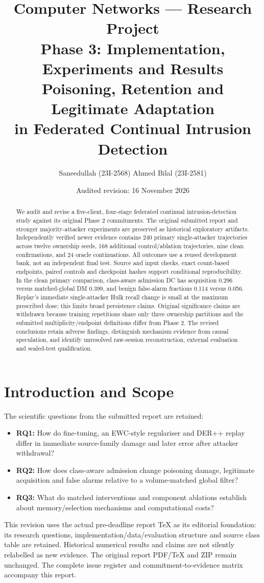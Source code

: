 \documentclass[10pt,a4paper]{article}
\title{\textbf{Computer Networks --- Research Project}\\[4pt]
\large Phase 3: Implementation, Experiments and Results\\[8pt]
\Large Poisoning, Retention and Legitimate Adaptation\\in Federated Continual Intrusion Detection}
\author{Saneedullah (23I-2568) \qquad Ahmed Bilal (23I-2581)}
\date{Audited revision: 16 November 2026}
\begin{document}
\maketitle
\begin{abstract}
We audit and revise a five-client, four-stage federated continual intrusion-detection study against its original Phase 2 commitments. The original submitted report and stronger majority-attacker experiments are preserved as historical exploratory artifacts. Independently verified newer evidence contains 240 primary single-attacker trajectories across twelve ownership seeds, 168 additional control/ablation trajectories, nine clean confirmations, and 24 oracle continuations. All outcomes use a reused development bank, not an independent final test. Source and input checks, exact count-based endpoints, paired controls and checkpoint hashes support conditional reproducibility. In the clean primary comparison, class-aware admission DC has acquisition 0.296 versus matched-global DM 0.399, and benign false-alarm fractions 0.114 versus 0.056. Replay's immediate single-attacker Hulk recall change is small at the maximum prescribed dose; this limits broad persistence claims. Original significance claims are withdrawn because training repetitions share only three ownership partitions and the submitted multiplicity/endpoint definitions differ from Phase 2. The revised conclusions retain adverse findings, distinguish mechanism evidence from causal speculation, and identify unresolved raw-session reconstruction, external evaluation and sealed-test qualification.
\end{abstract}
\section{Introduction and Scope}
The scientific questions from the submitted report are retained:
\begin{itemize}
\item \textbf{RQ1:} How do fine-tuning, an EWC-style regulariser and DER++ replay differ in immediate source-family damage and later error after attacker withdrawal?
\item \textbf{RQ2:} How does class-aware admission change poisoning damage, legitimate acquisition and false alarms relative to a volume-matched global filter?
\item \textbf{RQ3:} What do matched interventions and component ablations establish about memory/selection mechanisms and computational costs?
\end{itemize}
This revision uses the actual pre-deadline report TeX as its editorial foundation: its research questions, implementation/data/evaluation structure and source class table are retained. Historical numerical results and claims are not silently relabelled as new evidence. The original report PDF/TeX and ZIP remain unchanged. The complete issue register and commitment-to-evidence matrix accompany this report.
\end{document}
